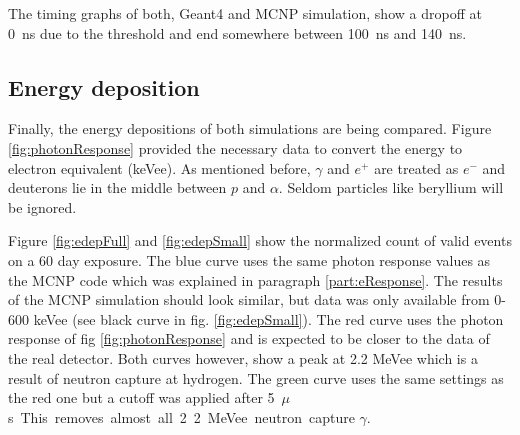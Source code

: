 \documentclass[12pt]{article}
\begin{document}
The timing graphs of both, Geant4 and MCNP simulation, show a dropoff at \SI{0}{ns} due to the threshold and end somewhere between \SI{100}{ns} and \SI{140}{ns}.  

\subsection{Energy deposition}

Finally, the energy depositions of both simulations are being compared. Figure \ref{fig:photonResponse} provided the necessary data to convert the energy to electron equivalent (keVee). As mentioned before, $\gamma$ and $e^+$ are treated as $e^-$ and deuterons lie in the middle between $p$ and $\alpha$. Seldom particles like beryllium will be ignored.

Figure \ref{fig:edepFull} and \ref{fig:edepSmall} show the normalized count of valid events on a 60 day exposure. The blue curve uses the same photon response values as the MCNP code which was explained in paragraph \ref{part:eResponse}. The results of the MCNP simulation should look similar, but data was only available from 0-600 keVee (see black curve in fig. \ref{fig:edepSmall}). 
The red curve uses the photon response of fig \ref{fig:photonResponse} and is expected to be closer to the  data of the real detector. Both curves however, show a peak at 2.2 MeVee which is a result of neutron capture at hydrogen.
The green curve uses the same settings as the red one but a cutoff was applied after \SI{5}{$\mu$ s}. This removes almost all 2.2 MeVee neutron capture $\gamma$.
\end{document}
